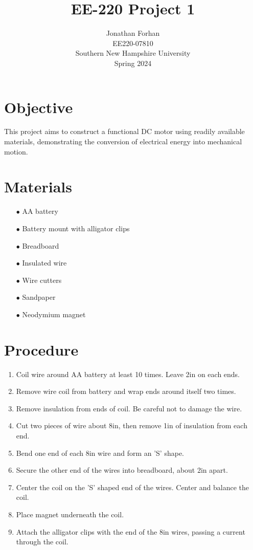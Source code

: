 \documentclass[12pt]{article}
\title{EE-220 Project 1}
\author{Jonathan Forhan\\ EE220-07810\\ Southern New Hampshire University\\ Spring 2024}
\date{ }
\begin{document}
\maketitle
\tableofcontents
\thispagestyle{empty}
\clearpage

\section{Objective}

This project aims to construct a functional DC motor using readily available materials,
demonstrating the conversion of electrical energy into mechanical motion.

\section{Materials}

\begin{enumerate}
	\item[$\bullet$] AA battery
	\item[$\bullet$] Battery mount with alligator clips
	\item[$\bullet$] Breadboard
	\item[$\bullet$] Insulated wire
	\item[$\bullet$] Wire cutters
	\item[$\bullet$] Sandpaper
	\item[$\bullet$] Neodymium magnet
\end{enumerate}

\section{Procedure}

\begin{enumerate}
	\item Coil wire around AA battery at least 10 times. Leave 2in on each ends.
	\item Remove wire coil from battery and wrap ends around itself two times.
	\item Remove insulation from ends of coil. Be careful not to damage the wire.
	\item Cut two pieces of wire about 8in, then remove 1in of insulation from each end.
	\item Bend one end of each 8in wire and form an 'S' shape.
	\item Secure the other end of the wires into breadboard, about 2in apart.
	\item Center the coil on the 'S' shaped end of the wires. Center and balance the coil.
	\item Place magnet underneath the coil.
	\item Attach the alligator clips with the end of the 8in wires, passing a current through the coil.
\end{enumerate}
\end{document}
